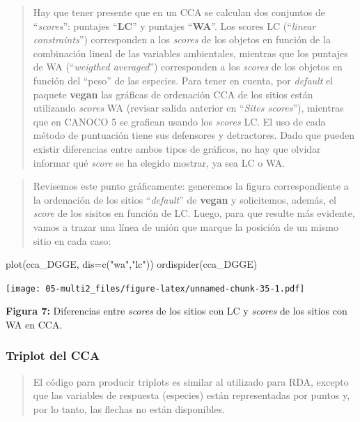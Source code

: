 \documentclass[
]{book}
\newenvironment{Shaded}{\begin{snugshade}}{\end{snugshade}}
\newcommand{\AttributeTok}[1]{\textcolor[rgb]{0.77,0.63,0.00}{#1}}
\newcommand{\FunctionTok}[1]{\textcolor[rgb]{0.00,0.00,0.00}{#1}}
\newcommand{\NormalTok}[1]{#1}
\newcommand{\StringTok}[1]{\textcolor[rgb]{0.31,0.60,0.02}{#1}}
\begin{document}
\begin{quote}
Hay que tener presente que en un CCA se calculan dos conjuntos de ``\emph{scores}'': puntajes ``\textbf{LC}'' y puntajes ``\textbf{WA}''. Los scores LC (``\emph{linear constraints}'') corresponden a los \emph{scores} de los objetos en función de la combinación lineal de las variables ambientales, mientras que los puntajes de WA (``\emph{weigthed averaged}'') corresponden a los \emph{scores} de los objetos en función del ``peso'' de las especies. Para tener en cuenta, por \emph{default} el paquete \textbf{vegan} las gráficas de ordenación CCA de los sitios están utilizando \emph{scores} WA (revisar salida anterior en ``\emph{Sites scores}''), mientras que en CANOCO 5 se grafican usando los \emph{scores} LC. El uso de cada método de puntuación tiene sus defensores y detractores. Dado que pueden existir diferencias entre ambos tipos de gráficos, no hay que olvidar informar qué \emph{score} se ha elegido mostrar, ya sea LC o WA.
\end{quote}

\begin{quote}
Revisemos este punto gráficamente: generemos la figura correspondiente a la ordenación de los sitios ``\emph{default}'' de \textbf{vegan} y solicitemos, además, el \emph{score} de los sisitos en función de LC. Luego, para que resulte más evidente, vamos a trazar una línea de unión que marque la posición de un mismo sitio en cada caso:
\end{quote}

\begin{Shaded}
\begin{Highlighting}[]
\FunctionTok{plot}\NormalTok{(cca\_DGGE, }\AttributeTok{dis=}\FunctionTok{c}\NormalTok{(}\StringTok{"wa"}\NormalTok{,}\StringTok{"lc"}\NormalTok{))}
\FunctionTok{ordispider}\NormalTok{(cca\_DGGE)}
\end{Highlighting}
\end{Shaded}

\texttt{[image: 05-multi2\_files/figure-latex/unnamed-chunk-35-1.pdf]}

\textbf{Figura 7:} Diferencias entre \emph{scores} de los sitios con LC y \emph{scores} de los sitios con WA en CCA.

\hypertarget{triplot-del-cca}{%
\subsubsection{Triplot del CCA}\label{triplot-del-cca}}

\begin{quote}
El código para producir triplots es similar al utilizado para RDA, excepto que las variables de respuesta (especies) están representadas por puntos y, por lo tanto, las flechas no están disponibles.
\end{quote}
\end{document}
